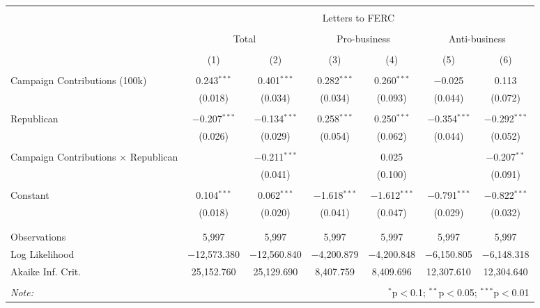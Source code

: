 
\begin{tabular}{@{\extracolsep{5pt}}lcccccc} 
\\[-1.8ex]\hline 
\hline \\[-1.8ex] 
 & \multicolumn{6}{c}{Letters to FERC} \\ 
\cline{2-7} 
\\[-1.8ex] & \multicolumn{2}{c}{Total} & \multicolumn{2}{c}{Pro-business} & \multicolumn{2}{c}{Anti-business} \\ 
\\[-1.8ex] & (1) & (2) & (3) & (4) & (5) & (6)\\ 
\hline \\[-1.8ex] 
 Campaign Contributions (100k) & 0.243$^{***}$ & 0.401$^{***}$ & 0.282$^{***}$ & 0.260$^{***}$ & $-$0.025 & 0.113 \\ 
  & (0.018) & (0.034) & (0.034) & (0.093) & (0.044) & (0.072) \\ 
  & & & & & & \\ 
 Republican & $-$0.207$^{***}$ & $-$0.134$^{***}$ & 0.258$^{***}$ & 0.250$^{***}$ & $-$0.354$^{***}$ & $-$0.292$^{***}$ \\ 
  & (0.026) & (0.029) & (0.054) & (0.062) & (0.044) & (0.052) \\ 
  & & & & & & \\ 
 Campaign Contributions × Republican &  & $-$0.211$^{***}$ &  & 0.025 &  & $-$0.207$^{**}$ \\ 
  &  & (0.041) &  & (0.100) &  & (0.091) \\ 
  & & & & & & \\ 
 Constant & 0.104$^{***}$ & 0.062$^{***}$ & $-$1.618$^{***}$ & $-$1.612$^{***}$ & $-$0.791$^{***}$ & $-$0.822$^{***}$ \\ 
  & (0.018) & (0.020) & (0.041) & (0.047) & (0.029) & (0.032) \\ 
  & & & & & & \\ 
\hline \\[-1.8ex] 
Observations & 5,997 & 5,997 & 5,997 & 5,997 & 5,997 & 5,997 \\ 
Log Likelihood & $-$12,573.380 & $-$12,560.840 & $-$4,200.879 & $-$4,200.848 & $-$6,150.805 & $-$6,148.318 \\ 
Akaike Inf. Crit. & 25,152.760 & 25,129.690 & 8,407.759 & 8,409.696 & 12,307.610 & 12,304.640 \\ 
\hline 
\hline \\[-1.8ex] 
\textit{Note:}  & \multicolumn{6}{r}{$^{*}$p$<$0.1; $^{**}$p$<$0.05; $^{***}$p$<$0.01} \\ 
\end{tabular} 
